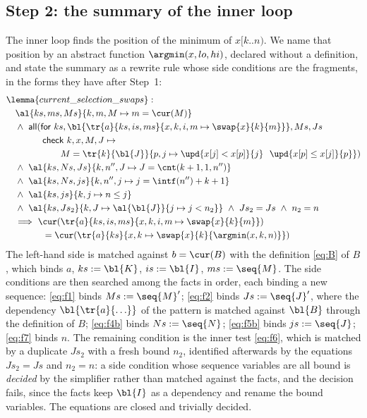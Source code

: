 \subsection{Step 2: the summary of the inner loop}\label{sec:sel:sum}

The inner loop finds the position of the minimum of $x[k..n)$. We name that position by an abstract
function $\argmin(x, lo, hi)$, declared without a definition, and state the summary as a rewrite rule
whose side conditions are the fragments, in the forms they have after Step~1:
\begin{align*}
  &\lemma{current\_selection\_swaps}:\\
  &\quad \al{ks, ms, Ms}{k, m, M \mapsto m = \cur(M)} \\
  &\quad\wedge\ \mathsf{all}(\mathsf{for}\ ks, \bl{\tr{a}{ks, is, ms}{x, k, i, m \mapsto \swap{x}{k}{m}}}, Ms, Js\\
  &\qquad\qquad \mathsf{check}\ k, x, M, J \mapsto {}\\
  &\qquad\qquad\qquad M = \tr{k}{\bl{J}}{p, j \mapsto \upd{x[j] < x[p]}{j}\ \ \upd{x[p] \le x[j]}{p}}) \\
  &\quad\wedge\ \al{ks, Ns, Js}{k, n'', J \mapsto J = \cnt(k + 1, 1, n'')} \\
  &\quad\wedge\ \al{ks, Ns, js}{k, n'', j \mapsto j = \intf(n'') + k + 1}\\
  &\quad\wedge\ \al{ks, js}{k, j \mapsto n \le j} \\
  &\quad\wedge\ \al{ks, Js_2}{k, J \mapsto \al{\bl{J}}{j \mapsto j < n_2}}\ \wedge\ Js_2 = Js\ \wedge\ n_2 = n \\
  &\quad\Longrightarrow\ \cur(\tr{a}{ks, is, ms}{x, k, i, m \mapsto \swap{x}{k}{m}})\\
  &\qquad\qquad = \cur(\tr{a}{ks}{x, k \mapsto \swap{x}{k}{\argmin(x, k, n)}})
\end{align*}
The left-hand side is matched against $b = \cur(B)$ with the definition \eqref{eq:B} of $B$, which binds
$a$, $ks := \bl{K}$, $is := \bl{I}$, $ms := \seq{M}$. The side conditions are then searched among the
facts in order, each binding a new sequence: \eqref{eq:f1} binds $Ms := \seq{M}'$; \eqref{eq:f2} binds
$Js := \seq{J}'$, where the dependency $\bl{\tr{a}{\ldots}}$ of the pattern is matched against $\bl{B}$
through the definition of $B$; \eqref{eq:f4b} binds $Ns := \seq{N}$; \eqref{eq:f5b} binds $js := \seq{J}$;
\eqref{eq:f7} binds $n$. The remaining condition is the inner test \eqref{eq:f6}, which is matched by a
duplicate $Js_2$ with a fresh bound $n_2$, identified afterwards by the equations $Js_2 = Js$ and $n_2 = n$:
a side condition whose sequence variables are all bound is \emph{decided} by the simplifier rather than
matched against the facts, and the decision fails, since the facts keep $\bl{I}$ as a dependency and
rename the bound variables. The equations are closed and trivially decided.

